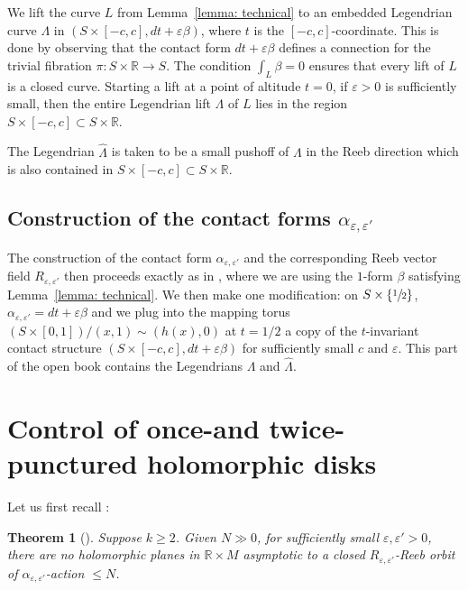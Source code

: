 \documentclass[JEP,XML,SOM,Unicode,NoFloatCountersInSection]{cedram}
\theoremstyle{plain}
\newtheorem{thm}{Theorem}[section]
\theoremstyle{definition}
\numberwithin{equation}{subsection}
\newcommand{\RR}{\mathbb{R}}
\begin{document}
We lift the curve $L$ from Lemma~\ref{lemma: technical} to an embedded Legendrian curve $\Lambda$ in \hbox{$(S\times [-c,c] ,dt+\varepsilon \beta)$}, where $t$ is the $[-c,c]$-coordinate. This is done by observing that the contact form $dt+\varepsilon \beta$ defines a connection for the trivial fibration $\pi : S\times \RR \to S$.
The condition $\int_{L} \beta =0$ ensures that every lift of $L$ is a closed curve. Starting a lift at a point of altitude $t=0$, if $\varepsilon>0$ is sufficiently small, then the entire Legendrian lift $\Lambda$ of $L$ lies in the region $S\times [-c,c] \subset S\times \RR$.

The Legendrian $\widehat{\Lambda}$ is taken to be a small pushoff of $\Lambda$ in the Reeb direction which is also contained in $S\times [-c,c] \subset S\times \RR$.

\subsection{Construction of the contact forms $\alpha_{\varepsilon,\varepsilon'}$}\label{subsection: construction of forms}

The construction of the contact form $\alpha_{\varepsilon, \varepsilon'}$ and the corresponding Reeb vector field $R_{\varepsilon,\varepsilon'}$ then proceeds exactly as in \cite[\S 6.2]{CH2}, where we are using the $1$-form $\beta$ satisfying Lemma~\ref{lemma: technical}. We then make one modification: on $S\times\{\sfrac{1}{2}\}$, $\alpha_{\varepsilon,\varepsilon'}= dt+\varepsilon\beta$ and we plug into the mapping torus $(S\times [0,1])/(x,1)\sim(h(x),0)$ at $t={1/2}$ a copy of the $t$-invariant contact structure $(S\times [-c,c] , dt+\varepsilon \beta)$ for sufficiently small $c$ and $\varepsilon$. This part of the open book contains the Legendrians $\Lambda$ and $\widehat\Lambda$.

\section{Control of once-and twice-punctured holomorphic disks}

Let us first recall \cite[Th.\,8.1]{CH2}:

\begin{thm}[\cite{CH2}]\label{thm: planes}
Suppose $k\!\geq\!2$. Given $N\!\gg\!0$, for sufficiently small \hbox{$\varepsilon,\varepsilon'\!>\!0$}, there are no holomorphic planes in $\RR\times M$ asymptotic to a closed $R_{\varepsilon,\varepsilon'}$-Reeb orbit of $\alpha_{\varepsilon,\varepsilon'}$-action $\leq N$.
\end{thm}
\end{document}
